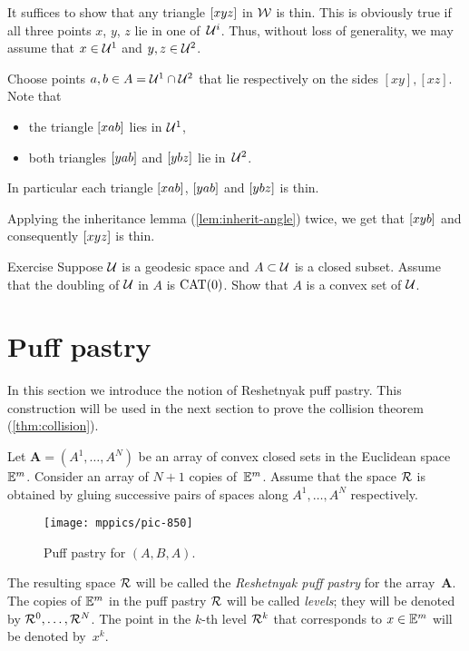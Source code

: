It suffices to show that any triangle $[xyz]$ 
in $\mathcal{W}$ is thin.
This is obviously true if all three points $x$, $y$, $z$ lie in one of~$\mathcal{U}^i$.
Thus, without loss of generality, we may assume that $x\z\in\spc{U}^1$ and $y,z\z\in\spc{U}^2$.


Choose points $a,b\in A\z=\spc{U}^1\z\cap\spc{U}^2$ 
that lie respectively on the sides $[xy], [xz]$.
Note that

\begin{itemize}
\item the triangle $[xab]$ lies in $\mathcal{U}^1$,
\item both triangles $[yab]$ and $[ybz]$ lie in~$\mathcal{U}^2$.
\end{itemize}
In particular each triangle $[xab]$,
$[yab]$ and $[ybz]$ is thin.

Applying the inheritance lemma (\ref{lem:inherit-angle}) twice, 
we get that $[xyb]$ 
and consequently $[xyz]$ is thin.
\qeds

\begin{thm}{Exercise}\label{ex:reshetnyak-doubling}
Suppose $\mathcal{U}$ is a geodesic space and $A\subset \mathcal{U}$ is a closed subset.
Assume that the doubling of $\mathcal{U}$ in $A$ is $\mathrm{CAT}(0)$. 
Show that $A$ is a convex set of $\mathcal{U}$.
\end{thm}



\section{Puff pastry}\label{sec:puff-pastry}

In this section we introduce 
the notion of 
Reshetnyak puff pastry.  This  construction will be used in the next section to prove the collision theorem (\ref{thm:collision}).

Let $\bm{A}=(A^1,\dots,A^N)$ be an array of convex closed sets in the Euclidean space~$\mathbb{E}^m$.
Consider an array of $N+1$ copies of~$\mathbb{E}^m$.
Assume that the space $\mathcal{R}$ is 
obtained by
gluing successive pairs of spaces along  $A^1,\dots,A^N$ respectively.


\begin{figure}[h!]
\vskip-0mm
\centering
\texttt{[image: mppics/pic-850]}
\caption*{Puff pastry for $(A,B,A)$.}
\end{figure}

The resulting space $\mathcal{R}$  will be called 
the
\emph{Reshetnyak puff pastry} for the array~$\bm{A}$.
The copies of $\mathbb{E}^m$ in the puff pastry $\mathcal{R}$
will be called {}\emph{levels};
they will be denoted by $\mathcal{R}^0,\dots,\mathcal{R}^N$.
The point in the $k$-th level $\mathcal{R}^k$
that corresponds to $x\in \mathbb{E}^m$
will be denoted by~$x^k$.

